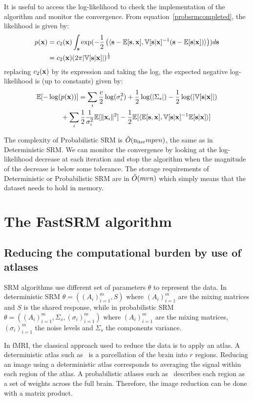 \documentclass{article}
\begin{document}
It is useful to access the log-likelihood to check the implementation of the
algorithm and monitor the convergence.
%
From equation~\eqref{probsrmcompleted},
the likelihood is given by:
\begin{align}
  p(\mathbf{x}) &= c_2(\mathbf{x}) \int_{\mathbf{s}} \exp(-\frac12 \left( \langle{  \mathbf{s}- \mathbb{E}[\mathbf{s}},{ \mathbf{x}], \mathbb{V}[\mathbf{s} | \mathbf{x}]^{-1} ( \mathbf{s} - \mathbb{E}[\mathbf{s} | \mathbf{x}])  }\rangle \right)) d\mathbf{s} \\
         &= c_2(\mathbf{x}) (2 \pi |\mathbb{V}[\mathbf{s} | \mathbf{x}]|)^{\frac12}
\end{align}
replacing $c_2(\mathbf{x})$ by its expression and taking the log, the expected negative
log-likelihood is (up to constants) given by:
\begin{align}
  \mathbb{E}[-\log(&p(\mathbf{x}))] = \sum_i \frac{v}{2} \log(\sigma_i^2) + \frac12 \log(|\Sigma_s|) - \frac12 \log(|\mathbb{V}[\mathbf{s} | \mathbf{x}]|) \nonumber \\ &+ \sum_i
  \frac12 \frac1{\sigma_i^2} \mathbb{E}[\|\mathbf{x}_i\|^2] - \frac12 \mathbb{E}[\langle{  \mathbb{E}[\mathbf{s}},{ \mathbf{x}], \mathbb{V}[\mathbf{s} | \mathbf{x}]^{-1} \mathbb{E}[\mathbf{s} | \mathbf{x}] }\rangle]
\end{align}

The complexity of Probabilistic SRM is $\tilde{O}(\mathrm{n_{iter}} mpvn)$, the same as in
Deterministic SRM.
%
We can monitor the convergence by looking at the log-likelihood decrease at each iteration
and stop the algorithm when the magnitude of the decrease is below some
tolerance.
%
The storage requirements of Deterministic or Probabilistic SRM are in
$\tilde{O}(mvn)$ which simply means that the dataset needs to hold in memory.
%


\section{The FastSRM algorithm}

\subsection{Reducing the computational burden by use of atlases}
SRM algorithms use different set of parameters $\theta$ to represent the data.
%
In deterministic SRM $\theta = \left((A_i)_{i=1}^m, S \right)$ where $(A_i)_{i=1}^m$ are the
mixing matrices and $S$ is the shared response, while in probabilistic SRM $\theta
= \left( (A_i)_{i=1}^m, \Sigma_s, (\sigma_i)_{i=1}^m \right) $ where $(A_i)_{i=1}^m$ are the
mixing matrices, $(\sigma_i)_{i=1}^m$ the noise levels and $\Sigma_s$ the
components variance.
%


In fMRI, the classical approach used to reduce the data is to apply an atlas.
%
A deterministic atlas such as~\cite{bellec2010multi} is a parcellation of the
brain into $r$ regions.
%
Reducing an image using a deterministic atlas corresponds to
averaging the signal within each region of the atlas.
%
A probabilistic atlases such
as~\cite{dadi_fine-grain_2020} describes each region as a set of weights across
the full brain.
%
Therefore, the image reduction can be done with a matrix product.
%
\end{document}
